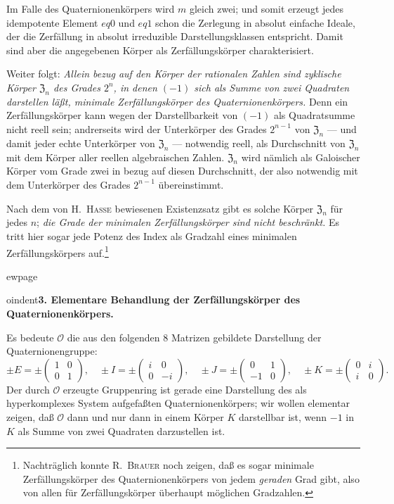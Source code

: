 \documentclass[12pt,a4paper]{article}
\theoremstyle{definition}
\begin{document}
Im Falle des Quaternionenk\"orpers wird $m$ gleich zwei; und somit erzeugt
jedes idempotente Element $ eq 0$ und $ eq 1$ schon die Zerlegung in
absolut einfache Ideale, der die Zerf\"allung in absolut irreduzible
Darstellungsklassen entspricht. Damit sind aber die angegebenen K\"orper
als Zerf\"allungsk\"orper charakterisiert.

Weiter folgt: \textit{Allein bezug auf den K\"orper der rationalen Zahlen
sind zyklische K\"orper $\mathfrak{Z}_n$ des Grades $2^n$, in denen $(-1)$
sich als Summe von zwei Quadraten darstellen l\"a\ss t, minimale
Zerf\"allungsk\"orper des Quaternionenk\"orpers.} Denn ein
Zerf\"allungsk\"orper kann wegen der Darstellbarkeit von $(-1)$ als
Quadratsumme nicht reell sein; andrerseits wird der Unterk\"orper des
Grades $2^{n-1}$ von $\mathfrak{Z}_n$ --- und damit jeder echte Unterk\"orper
von $\mathfrak{Z}_n$ --- notwendig reell, als Durchschnitt von
$\mathfrak{Z}_n$ mit dem K\"orper aller reellen algebraischen Zahlen.
$\mathfrak{Z}_n$ wird n\"amlich als Galoischer K\"orper vom Grade zwei in
bezug auf diesen Durchschnitt, der also notwendig mit dem Unterk\"orper
des Grades $2^{n-1}$ \"ubereinstimmt.

Nach dem von H.\ \textsc{Hasse} bewiesenen Existenzsatz gibt es solche
K\"orper $\mathfrak{Z}_n$ f\"ur jedes $n$; \textit{die Grade der minimalen
Zerf\"allungsk\"orper sind nicht beschr\"ankt.} Es tritt hier sogar jede
Potenz des Index als Gradzahl eines minimalen Zerf\"allungsk\"orpers
auf.\footnote{Nachtr\"aglich konnte R.\ \textsc{Brauer} noch zeigen, da\ss{}
es sogar minimale Zerf\"allungsk\"orper des Quaternionenk\"orpers von jedem
\textit{geraden} Grad gibt, also von allen f\"ur Zerf\"allungsk\"orper
\"uberhaupt m\"oglichen Gradzahlen.}



ewpage
\setcounter{page}{571}



oindent\textbf{3. Elementare Behandlung der Zerf\"allungsk\"orper des
Quaternionenk\"orpers.}

Es bedeute $\mathcal{O}$ die aus den folgenden 8 Matrizen gebildete
Darstellung der Quaternionengruppe:
\[
\pm E = \pm\begin{pmatrix}1&0\\0&1\end{pmatrix}, \quad
\pm I = \pm\begin{pmatrix}i&0\\0&-i\end{pmatrix}, \quad
\pm J = \pm\begin{pmatrix}0&1\\-1&0\end{pmatrix}, \quad
\pm K = \pm\begin{pmatrix}0&i\\i&0\end{pmatrix}.
\]
Der durch $\mathcal{O}$ erzeugte Gruppenring ist gerade eine Darstellung
des als hyperkomplexes System aufgefa\ss ten Quaternionenk\"orpers; wir
wollen elementar zeigen, da\ss{} $\mathcal{O}$ dann und nur dann in einem
K\"orper $K$ darstellbar ist, wenn $-1$ in $K$ als Summe von zwei
Quadraten darzustellen ist.
\end{document}
